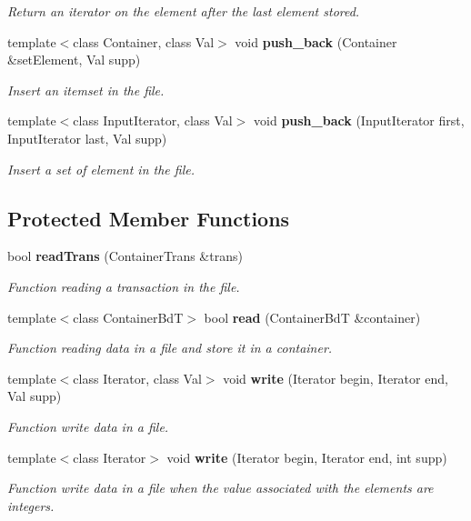 \begin{CompactItemize}
\begin{CompactList}\small\item\em Return an iterator on the element after the last element stored. \item\end{CompactList}\item 
template$<$class Container, class Val$>$ void {\bf push\_\-back} (Container \&set\-Element, Val supp)
\begin{CompactList}\small\item\em Insert an itemset in the file. \item\end{CompactList}\item 
template$<$class Input\-Iterator, class Val$>$ void {\bf push\_\-back} (Input\-Iterator first, Input\-Iterator last, Val supp)
\begin{CompactList}\small\item\em Insert a set of element in the file. \item\end{CompactList}\end{CompactItemize}
\subsection*{Protected Member Functions}
\begin{CompactItemize}
\item 
bool {\bf read\-Trans} (Container\-Trans \&trans)
\begin{CompactList}\small\item\em Function reading a transaction in the file. \item\end{CompactList}\item 
template$<$class Container\-Bd\-T$>$ bool {\bf read} (Container\-Bd\-T \&container)
\begin{CompactList}\small\item\em Function reading data in a file and store it in a container. \item\end{CompactList}\item 
template$<$class Iterator, class Val$>$ void {\bf write} (Iterator begin, Iterator end, Val supp)
\begin{CompactList}\small\item\em Function write data in a file. \item\end{CompactList}\item 
template$<$class Iterator$>$ void {\bf write} (Iterator begin, Iterator end, int supp)
\begin{CompactList}\small\item\em Function write data in a file when the value associated with the elements are integers. \item\end{CompactList}\end{CompactItemize}
